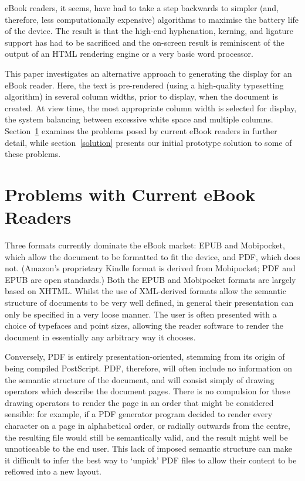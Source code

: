 eBook readers, it seems, have had to take a step backwards to simpler (and, therefore, less
computationally expensive) algorithms to maximise the battery life of the device. The result is that
the high-end hyphenation, kerning, and ligature support has had to be sacrificed and the on-screen
result is reminiscent of the output of an HTML rendering engine or a very basic word processor.

This paper investigates an alternative approach to generating the display for an eBook reader. Here,
the text is pre-rendered (using a high-quality typesetting algorithm) in several column widths,
prior to display, when the document is created. At view time, the most appropriate column width is
selected for display, the system balancing between excessive white space and multiple columns.
Section~\ref{problems} examines the problems posed by current eBook readers in further detail, while
section~\ref{solution} presents our initial prototype solution to some of these problems.

\section{Problems with Current eBook Readers}
\label{problems}
Three formats currently dominate the eBook market: EPUB and Mobipocket, which allow the document to
be formatted to fit the device, and PDF, which does not. (Amazon's proprietary Kindle format is
derived from Mobipocket; PDF and EPUB are open standards.) Both the EPUB and Mobipocket formats are
largely based on XHTML. Whilst the use of XML-derived formats allow the semantic structure of
documents to be very well defined, in general their presentation can only be specified in a very
loose manner. The user is often presented with a choice of typefaces and point sizes, allowing the
reader software to render the document in essentially any arbitrary way it chooses.

Conversely, PDF is entirely presentation-oriented, stemming from its origin of being compiled
PostScript. PDF, therefore, will often include no information on the semantic structure of the
document, and will consist simply of drawing operators which describe the document pages. There is
no compulsion for these drawing operators to render the page in an order that might be considered
sensible: for example, if a PDF generator program decided to render every character on a page in
alphabetical order, or radially outwards from the centre, the resulting file would still be
semantically valid, and the result might well be unnoticeable to the end user. This lack of imposed
semantic structure can make it difficult to infer the best way to `unpick' PDF files to allow their
content to be reflowed into a new layout.

